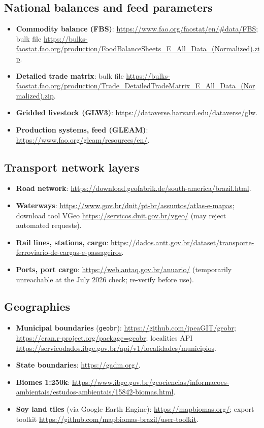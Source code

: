 \subsection*{National balances and feed parameters}
\begin{itemize}
  \item \textbf{Commodity balance (FBS)}:
    \url{https://www.fao.org/faostat/en/#data/FBS}; bulk file
    \url{https://bulks-faostat.fao.org/production/FoodBalanceSheets_E_All_Data_(Normalized).zip}.
  \item \textbf{Detailed trade matrix}: bulk file
    \url{https://bulks-faostat.fao.org/production/Trade_DetailedTradeMatrix_E_All_Data_(Normalized).zip}.
  \item \textbf{Gridded livestock (GLW3)}:
    \url{https://dataverse.harvard.edu/dataverse/glw}.
  \item \textbf{Production systems, feed (GLEAM)}:
    \url{https://www.fao.org/gleam/resources/en/}.
\end{itemize}

\subsection*{Transport network layers}
\begin{itemize}
  \item \textbf{Road network}:
    \url{https://download.geofabrik.de/south-america/brazil.html}.
  \item \textbf{Waterways}:
    \url{https://www.gov.br/dnit/pt-br/assuntos/atlas-e-mapas}; download
    tool VGeo \url{https://servicos.dnit.gov.br/vgeo/} (may reject
    automated requests).
  \item \textbf{Rail lines, stations, cargo}:
    \url{https://dados.antt.gov.br/dataset/transporte-ferroviario-de-cargas-e-passageiros}.
  \item \textbf{Ports, port cargo}:
    \url{https://web.antaq.gov.br/anuario/} (temporarily unreachable at
    the July 2026 check; re-verify before use).
\end{itemize}

\subsection*{Geographies}
\begin{itemize}
  \item \textbf{Municipal boundaries} (\texttt{geobr}):
    \url{https://github.com/ipeaGIT/geobr};
    \url{https://cran.r-project.org/package=geobr}; localities API
    \url{https://servicodados.ibge.gov.br/api/v1/localidades/municipios}.
  \item \textbf{State boundaries}: \url{https://gadm.org/}.
  \item \textbf{Biomes 1:250k}:
    \url{https://www.ibge.gov.br/geociencias/informacoes-ambientais/estudos-ambientais/15842-biomas.html}.
  \item \textbf{Soy land tiles} (via Google Earth Engine):
    \url{https://mapbiomas.org/}; export toolkit
    \url{https://github.com/mapbiomas-brazil/user-toolkit}.
\end{itemize}

